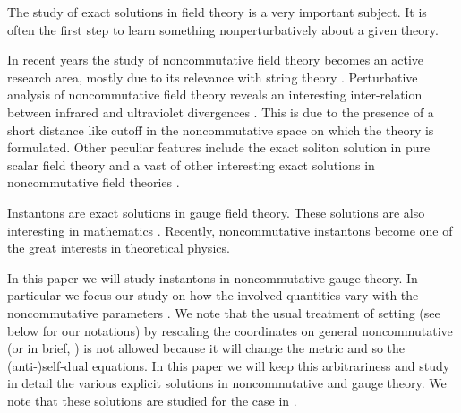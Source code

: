 \documentclass[a4paper,a4paper]{article}
\begin{document}
The study of exact solutions in field theory is a very important
subject. It is often the first step to learn something
nonperturbatively about a given theory.

In recent years the study of noncommutative field theory becomes
an active research area, mostly due to its relevance with string
theory \cite{WittenSeiberg}. Perturbative analysis of
noncommutative field theory reveals an interesting inter-relation
between infrared and ultraviolet divergences \cite{Seiberg}. This
is due to the presence of a short distance like cutoff in the
noncommutative space on which the theory is formulated. Other
peculiar features include the exact soliton solution in pure
scalar field theory \cite{GSM} and a vast of other interesting
exact solutions in noncommutative field theories \cite{Harvey}.

Instantons are exact solutions in gauge field theory. These
solutions are also interesting in mathematics \cite{Donaldson}.
Recently, noncommutative instantons \cite{Schwarz} become one of
the great interests in theoretical physics.

In this paper we will study instantons in noncommutative gauge
theory. In particular we focus our study on how the involved
quantities vary with the noncommutative parameters \coordHE{}.
We note that the usual treatment of setting \coordHE{}
(see below for our notations) by rescaling the coordinates \coordHE{}
on general noncommutative \coordHE{} (or in brief, \coordHE{}) is not allowed because it will change the metric and so
the (anti-)self-dual equations. In this paper we will keep this
arbitrariness and study in detail the various explicit solutions
in noncommutative \coordHE{} and \coordHE{} gauge theory. We note that
these solutions are studied for the case \coordHE{} in
\cite{Papera,Paperb,Paperc,Paperd,Hamanaka}.
\end{document}
